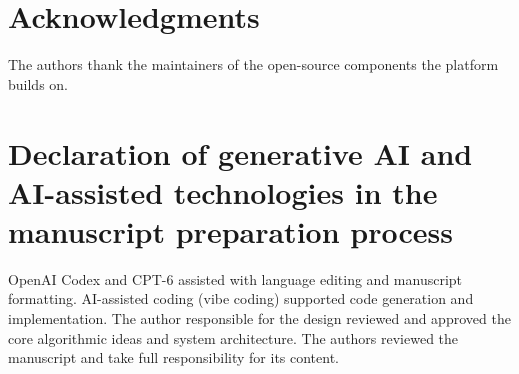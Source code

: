 \section*{Acknowledgments}
The authors thank the maintainers of the open-source components the platform
builds on. %

\section*{Declaration of generative AI and AI-assisted technologies in the manuscript preparation process}
OpenAI Codex and CPT-6 assisted with language editing and manuscript
formatting. AI-assisted coding (vibe coding) supported code generation and
implementation. The author responsible for the design reviewed and approved
the core algorithmic ideas and system architecture. The authors reviewed the
manuscript and take full responsibility for its content.

